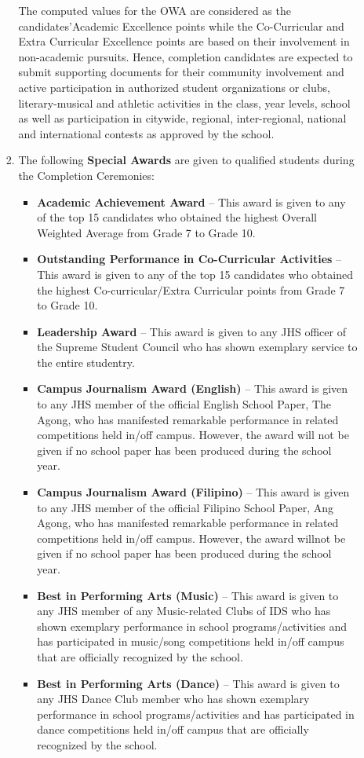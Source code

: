 \begin{enumerate}[label=(\Alph*)]
\begin{enumerate}[label=\Alph{enumi}.\arabic*]
\begin{enumerate}[label=\arabic*.]
			The computed values for the OWA are considered as the candidates’Academic Excellence points while the Co-Curricular and Extra Curricular Excellence points are based on their involvement in non-academic pursuits. Hence, completion candidates are expected to submit supporting documents for their community involvement and active participation in authorized student organizations or clubs, literary-musical and athletic activities in the class, year levels, school as well as participation in citywide, regional, inter-regional, national and international contests as approved by the school.
			\item  The following \textbf{Special Awards} are given to qualified students during the Completion Ceremonies: 
			\begin{itemize}
				\item  \textbf{Academic Achievement Award} – This award is given to any of the top 15 candidates who obtained the highest Overall Weighted Average from Grade 7 to Grade 10. 
				\item \textbf{Outstanding Performance in Co-Curricular Activities} – This award is given to any of the top 15 candidates who obtained the highest Co-curricular/Extra Curricular points from Grade 7 to Grade 10.
				\item \textbf{Leadership Award} – This award is given to any JHS officer of the Supreme Student Council who has shown exemplary service to the entire studentry.
				\item  \textbf{Campus Journalism Award (English)} – This award is given to any JHS member of the official English School Paper, The Agong, who has manifested remarkable performance in related competitions held in/off campus. However, the award will not be given if no school paper has been produced during the school year.
				\item \textbf{ Campus Journalism Award (Filipino)} – This award is given to any JHS member of the official Filipino School Paper, Ang Agong, who has manifested remarkable performance in related competitions held in/off campus. However, the award willnot be given if no school paper has been produced during the school year.
				\item  \textbf{Best in Performing Arts (Music)} – This award is given to any JHS member of any Music-related Clubs of IDS who has shown exemplary performance in school programs/activities and has participated in music/song competitions held in/off campus that are officially recognized by the school.
				\item  \textbf{Best in Performing Arts (Dance)} – This award is given to any JHS Dance Club member who has shown exemplary performance in school programs/activities and has participated in dance competitions held in/off campus that are officially recognized by the school.

\end{itemize}
\end{enumerate}
\end{enumerate}
\end{enumerate}
